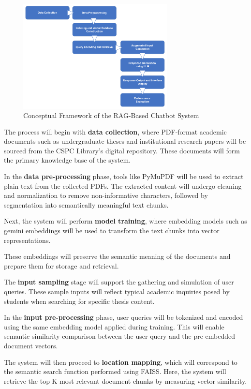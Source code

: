 \begin{refsection}
\begin{figure}[H]
    \centering
    \includegraphics[width=0.7\textwidth]{figures/framework.png}
    \caption{Conceptual Framework of the RAG-Based Chatbot System}
    \label{fig:conceptual_framework}
\end{figure}

The process will begin with \textbf{data collection}, where PDF-format academic documents such as undergraduate theses and institutional research papers will be sourced from the CSPC Library’s digital repository. These documents will form the primary knowledge base of the system.

In the \textbf{data pre-processing} phase, tools like PyMuPDF will be used to extract plain text from the collected PDFs. The extracted content will undergo cleaning and normalization to remove non-informative characters, followed by segmentation into semantically meaningful text chunks.

Next, the system will perform \textbf{model training}, where embedding models such as gemini embeddings will be used to transform the text chunks into vector representations.


These embeddings will preserve the semantic meaning of the documents and prepare them for storage and retrieval.

The \textbf{input sampling} stage will support the gathering and simulation of user queries. These sample inputs will reflect typical academic inquiries posed by students when searching for specific thesis content.

In the \textbf{input pre-processing} phase, user queries will be tokenized and encoded using the same embedding model applied during training. This will enable semantic similarity comparison between the user query and the pre-embedded document vectors.

The system will then proceed to \textbf{location mapping}, which will correspond to the semantic search function performed using FAISS. Here, the system will retrieve the top-K most relevant document chunks by measuring vector similarity.


\end{refsection}
